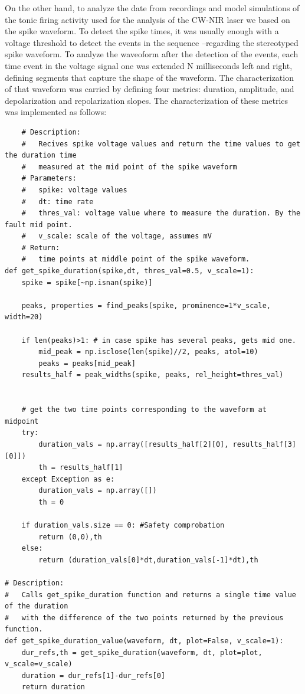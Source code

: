 On the other hand, to analyze the date from recordings and model simulations of the tonic firing activity used for the analysis of the CW-NIR laser we based on the spike waveform. To detect the spike times, it was usually enough with a voltage threshold to detect the events in the sequence --regarding the stereotyped spike waveform. To analyze the waveoform after the detection of the events, each time event in the voltage signal one was extended N milliseconds left and right, defining segments that capture the shape of the waveform. The characterization of that waveform was carried by defining four metrics: duration, amplitude, and depolarization and repolarization slopes. The characterization of these metrics was implemented as follows:

\begin{lstlisting}
	# Description: 
	# 	Recives spike voltage values and return the time values to get the duration time 
	#	measured at the mid point of the spike waveform 
	# Parameters:
	# 	spike: voltage values
	# 	dt: time rate
	# 	thres_val: voltage value where to measure the duration. By the fault mid point. 
	#	v_scale: scale of the voltage, assumes mV
	# Return:
	#	time points at middle point of the spike waveform. 
def get_spike_duration(spike,dt, thres_val=0.5, v_scale=1): 
	spike = spike[~np.isnan(spike)]
	
	peaks, properties = find_peaks(spike, prominence=1*v_scale, width=20)
	
	if len(peaks)>1: # in case spike has several peaks, gets mid one.
		mid_peak = np.isclose(len(spike)//2, peaks, atol=10)
		peaks = peaks[mid_peak]
	results_half = peak_widths(spike, peaks, rel_height=thres_val)
	
	
	# get the two time points corresponding to the waveform at midpoint
	try: 
		duration_vals = np.array([results_half[2][0], results_half[3][0]])
		th = results_half[1]
	except Exception as e:
		duration_vals = np.array([])
		th = 0
	
	if duration_vals.size == 0: #Safety comprobation
		return (0,0),th
	else:
		return (duration_vals[0]*dt,duration_vals[-1]*dt),th
	
# Description:
# 	Calls get_spike_duration function and returns a single time value of the duration
# 	with the difference of the two points returned by the previous function.
def get_spike_duration_value(waveform, dt, plot=False, v_scale=1):
	dur_refs,th = get_spike_duration(waveform, dt, plot=plot, v_scale=v_scale)
	duration = dur_refs[1]-dur_refs[0]
	return duration


\end{lstlisting}
